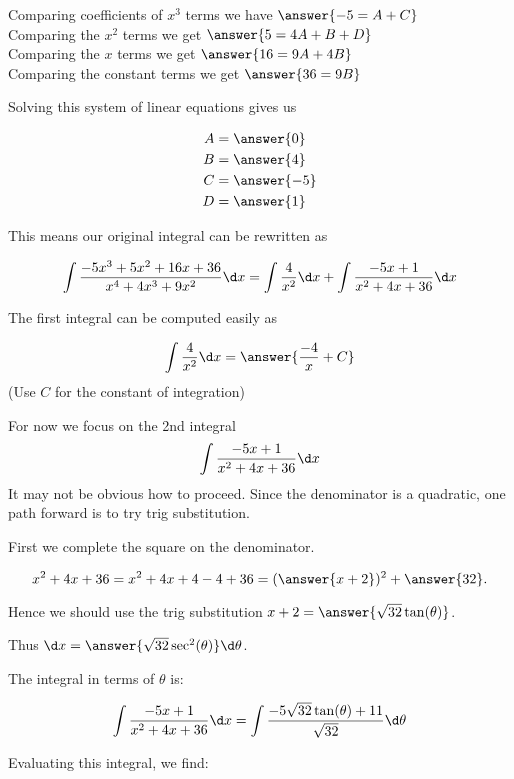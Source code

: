\documentclass{ximera}
\begin{document}
\begin{exercise}
\begin{exercise}
\begin{exercise}
Comparing coefficients of $x^{3}$ terms we have $\answer{-5=A+C}$ \\
Comparing the $x^{2}$ terms we get $\answer {5=4A+B+D}$ \\
Comparing the $x$ terms we get $\answer{16=9A+4B}$ \\
Comparing the constant terms we get $\answer{36=9B}$ 

\begin{exercise}
Solving this system of linear equations gives us

\begin{align*}
A&=\answer{  0 }\\
B&=\answer{4   }\\
C&=\answer{  -5 }\\
D&=\answer{1    }
\end{align*}

\begin{exercise}
This means our original integral can be rewritten as 

\[
\int \frac{-5x^{3}+5x^{2}+16x+36}{x^{4}+4x^{3}+9x^{2}} \d x= \int \frac{4}{x^{2}} \d x + \int \frac{-5x+1}{x^{2}+4x+36} \d x 
\]

The first integral can be computed easily as

\[
\int \frac{4}{x^{2}} \d x=\answer{\frac{-4}{x}+C}
\]
(Use $C$ for the constant of integration)

\begin{exercise}

For now we focus on the 2nd integral 
\[
\int \frac{-5x+1}{x^{2}+4x+36} \d x 
\]
It may not be obvious how to proceed. Since the denominator is a quadratic, one path forward is to try trig substitution.

\begin{exercise}

First we complete the square on the denominator. 

\[
x^{2}+4x+36=x^{2}+4x+4-4+36=(\answer{x+2})^2+\answer{32}.
\]

Hence we should use the trig substitution $x+2=\answer{\sqrt{32}\tan(\theta)}$. 

Thus $\d x=\answer{ \sqrt{32} \sec^{2}(\theta)} \d \theta$. 

\begin{exercise}
The integral in terms of $\theta$ is:

\[
\int \frac{-5x+1}{x^{2}+4x+36} \d x =\int   \frac{-5\sqrt{32}\tan(\theta)+11}{\sqrt{32}}  \d \theta
\]

Evaluating this integral, we find:



\end{exercise}
\end{exercise}
\end{exercise}
\end{exercise}
\end{exercise}
\end{exercise}
\end{exercise}
\end{exercise}
\end{document}
